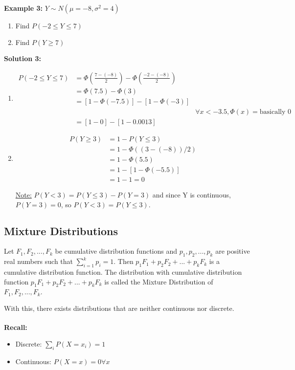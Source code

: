\documentclass[12pt, twoside]{article}
\begin{document}
\textbf{Example 3:} $Y\sim N(\mu =-8, \sigma^2 = 4)$
\begin{enumerate}
	\item{Find $P(-2 \leq Y \leq 7)$}
	\item{Find $P(Y \geq 7)$}
\end{enumerate}

\textbf{Solution 3:}
\begin{enumerate}
	\item{
	\begin{align*}
		P(-2 \leq Y \leq 7) &= \Phi (\frac{7 - (-8)}{2}) - \Phi (\frac{-2 - (-8)}{2})\\
		&= \Phi (7.5) - \Phi (3)\\
		&= [1 - \Phi (-7.5)] - [1 - \Phi (-3)]\\
		&& \forall x < -3.5, \Phi (x) = \text{basically 0}\\
		&= [1-0]-[1-0.0013]
	\end{align*}
	}
	\item{
	\begin{align*}
		P(Y \geq 3) &= 1 - P(Y \leq 3)\\
		&= 1 - \Phi ((3-(-8))/2)\\
		&= 1 - \Phi (5.5)\\
		&= 1 - [1 - \Phi (-5.5)]\\
		&= 1-1 = 0
	\end{align*}

	}
	
	\underline{Note:} $P(Y < 3) = P(Y \leq 3) - P(Y = 3)$ and since Y is continuous, $P(Y = 3) = 0$, so $P(Y < 3) = P(Y \leq 3)$.
	
\end{enumerate}

\subsection{Mixture Distributions}

\begin{tcolorbox}[title=Definition: Mixture Distribution]
	Let $F_1, F_2, ... , F_k$ be cumulative distribution functions and $p_1, p_2, ..., p_k$ are positive real numbers such that $\sum_{i=1}^k p_i = 1$. Then $p_1 F_1 + p_2 F_2 + ... + p_k F_k$ is a cumulative distribution function. The distribution with cumulative distribution function $p_1 F_1 + p_2 F_2 + ... + p_k F_k$ is called the Mixture Distribution of $F_1, F_2, ..., F_k$.
\end{tcolorbox}

With this, there exists distributions that are neither continuous nor discrete.\\
\\
\textbf{Recall:} \begin{itemize}
	\item{Discrete: $\sum_i P(X = x_i) = 1$}
	\item{Continuous: $P(X = x) = 0 \forall x$}
\end{itemize}
\end{document}
